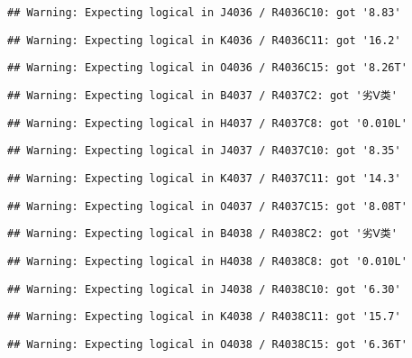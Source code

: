\documentclass[
]{article}
\begin{document}
\begin{verbatim}
## Warning: Expecting logical in J4036 / R4036C10: got '8.83'
\end{verbatim}

\begin{verbatim}
## Warning: Expecting logical in K4036 / R4036C11: got '16.2'
\end{verbatim}

\begin{verbatim}
## Warning: Expecting logical in O4036 / R4036C15: got '8.26T'
\end{verbatim}

\begin{verbatim}
## Warning: Expecting logical in B4037 / R4037C2: got '劣Ⅴ类'
\end{verbatim}

\begin{verbatim}
## Warning: Expecting logical in H4037 / R4037C8: got '0.010L'
\end{verbatim}

\begin{verbatim}
## Warning: Expecting logical in J4037 / R4037C10: got '8.35'
\end{verbatim}

\begin{verbatim}
## Warning: Expecting logical in K4037 / R4037C11: got '14.3'
\end{verbatim}

\begin{verbatim}
## Warning: Expecting logical in O4037 / R4037C15: got '8.08T'
\end{verbatim}

\begin{verbatim}
## Warning: Expecting logical in B4038 / R4038C2: got '劣Ⅴ类'
\end{verbatim}

\begin{verbatim}
## Warning: Expecting logical in H4038 / R4038C8: got '0.010L'
\end{verbatim}

\begin{verbatim}
## Warning: Expecting logical in J4038 / R4038C10: got '6.30'
\end{verbatim}

\begin{verbatim}
## Warning: Expecting logical in K4038 / R4038C11: got '15.7'
\end{verbatim}

\begin{verbatim}
## Warning: Expecting logical in O4038 / R4038C15: got '6.36T'
\end{verbatim}
\end{document}
